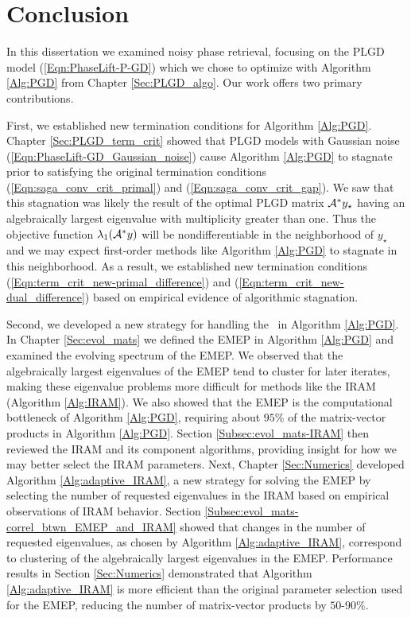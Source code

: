 \chapter{Conclusion}			\label{Sec:Conclusion}


In this dissertation we examined noisy phase retrieval, focusing on the PLGD model (\ref{Eqn:PhaseLift-P-GD}) which we chose to optimize with Algorithm \ref{Alg:PGD} from Chapter \ref{Sec:PLGD_algo}.
Our work offers two primary contributions.


First, we established new termination conditions for Algorithm \ref{Alg:PGD}.
Chapter \ref{Sec:PLGD_term_crit} showed that PLGD models with Gaussian noise (\ref{Eqn:PhaseLift-GD_Gaussian_noise}) cause Algorithm \ref{Alg:PGD} to stagnate prior to satisfying the original termination conditions (\ref{Eqn:saga_conv_crit_primal}) and (\ref{Eqn:saga_conv_crit_gap}).  
We saw that this stagnation was likely the result of the optimal PLGD matrix ${\mathcal A}^*y_\star$ having an algebraically largest eigenvalue with multiplicity greater than one.
Thus the objective function $\lambda_1({\mathcal A}^*y)$ will be nondifferentiable in the neighborhood of $y_\star$ and we may expect first-order methods like Algorithm \ref{Alg:PGD} to stagnate in this neighborhood.
As a result, we established new termination conditions (\ref{Eqn:term_crit_new-primal_difference}) and (\ref{Eqn:term_crit_new-dual_difference}) based on empirical evidence of algorithmic stagnation.


Second, we developed a new strategy for handling the \emep \ in Algorithm \ref{Alg:PGD}.
In Chapter \ref{Sec:evol_mats} we defined the EMEP in Algorithm \ref{Alg:PGD} and examined the evolving spectrum of the EMEP.
We observed that the algebraically largest eigenvalues of the EMEP tend to cluster for later iterates, making these eigenvalue problems more difficult for methods like the IRAM (Algorithm \ref{Alg:IRAM}).
We also showed that the EMEP is the computational bottleneck of Algorithm \ref{Alg:PGD}, requiring about $95$\% of the matrix-vector products in Algorithm \ref{Alg:PGD}.
Section \ref{Subsec:evol_mats-IRAM} then reviewed the IRAM and its component algorithms, providing insight for how we may better select the IRAM parameters.
Next, Chapter \ref{Sec:Numerics} developed Algorithm \ref{Alg:adaptive_IRAM}, a new strategy for solving the EMEP by selecting the number of requested eigenvalues in the IRAM based on empirical observations of IRAM behavior.
Section \ref{Subsec:evol_mats-correl_btwn_EMEP_and_IRAM} showed that changes in the number of requested eigenvalues, as chosen by Algorithm \ref{Alg:adaptive_IRAM}, correspond to clustering of the algebraically largest eigenvalues in the EMEP.
Performance results in Section \ref{Sec:Numerics} demonstrated that Algorithm \ref{Alg:adaptive_IRAM} is more efficient than the original parameter selection used for the EMEP, reducing the number of matrix-vector products by $50$-$90\%$.


